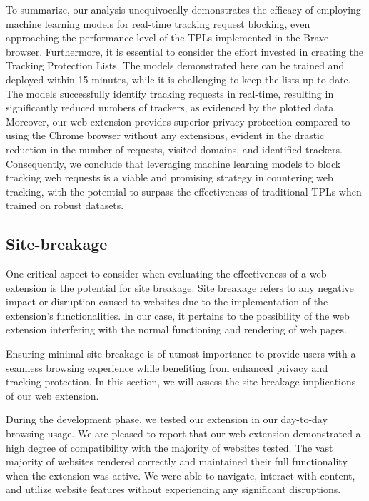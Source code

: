 To summarize, our analysis unequivocally demonstrates the efficacy of employing machine learning models for real-time tracking
request blocking, even approaching the performance level of the TPLs implemented in the Brave browser. 
Furthermore, it is essential to consider the effort invested in creating the Tracking Protection Lists. 
The models demonstrated here can be trained and deployed within 15 minutes, while it is challenging to keep the lists up to date. The models successfully
identify tracking requests in real-time, resulting in significantly reduced numbers of trackers, as evidenced by the plotted data.
Moreover, our web extension provides superior privacy protection compared to using the Chrome browser without any extensions, evident
in the drastic reduction in the number of requests, visited domains, and identified trackers. Consequently, we conclude that leveraging
machine learning models to block tracking web requests is a viable and promising strategy in countering web tracking, with the potential
to surpass the effectiveness of traditional TPLs when trained on robust datasets.






\subsection{Site-breakage}
One critical aspect to consider when evaluating the effectiveness of a web extension is the potential for site breakage.
Site breakage refers to any negative impact or disruption caused to websites due to the implementation of the extension's
functionalities. In our case, it pertains to the possibility of the web extension interfering with the normal functioning
and rendering of web pages.

Ensuring minimal site breakage is of utmost importance to provide users with a seamless browsing experience while benefiting
from enhanced privacy and tracking protection. In this section, we will assess the site breakage implications of our web extension.

During the development phase, we tested our extension in our day-to-day browsing usage. We are pleased to report that our web
extension demonstrated a high degree of compatibility with the majority of websites tested.
The vast majority of websites rendered correctly and maintained their full functionality when the extension was active. We
were able to navigate, interact with content, and utilize website features without experiencing any significant disruptions.

